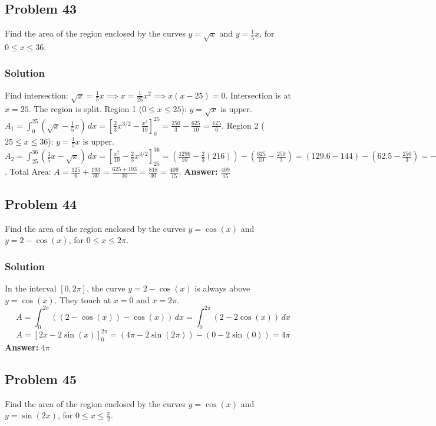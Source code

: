 \documentclass{article}
\begin{document}
\subsection{Problem 43}
Find the area of the region enclosed by the curves $y = \sqrt{x}$ and $y = \frac{1}{5}x$, for $0 \le x \le 36$.
\subsubsection*{Solution}
Find intersection: $\sqrt{x} = \frac{1}{5}x \implies x = \frac{1}{25}x^2 \implies x(x-25) = 0$. Intersection is at $x=25$. The region is split.
Region 1 ($0 \le x \le 25$): $y=\sqrt{x}$ is upper. $A_1 = \int_{0}^{25} (\sqrt{x} - \frac{1}{5}x) \,dx = [\frac{2}{3}x^{3/2} - \frac{x^2}{10}]_0^{25} = \frac{250}{3} - \frac{625}{10} = \frac{125}{6}$.
Region 2 ($25 \le x \le 36$): $y=\frac{1}{5}x$ is upper. $A_2 = \int_{25}^{36} (\frac{1}{5}x - \sqrt{x}) \,dx = [\frac{x^2}{10} - \frac{2}{3}x^{3/2}]_{25}^{36} = (\frac{1296}{10} - \frac{2}{3}(216)) - (\frac{625}{10} - \frac{250}{3}) = (129.6 - 144) - (62.5 - \frac{250}{3}) = -14.4 - (-\frac{125}{6}) = \frac{193}{30}$.
Total Area: $A = \frac{125}{6} + \frac{193}{30} = \frac{625+193}{30} = \frac{818}{30} = \frac{409}{15}$.
\textbf{Answer:} $ \frac{409}{15} $

\subsection{Problem 44}
Find the area of the region enclosed by the curves $y = \cos(x)$ and $y = 2 - \cos(x)$, for $0 \le x \le 2\pi$.
\subsubsection*{Solution}
In the interval $[0, 2\pi]$, the curve $y = 2 - \cos(x)$ is always above $y = \cos(x)$. They touch at $x=0$ and $x=2\pi$.
$$ A = \int_{0}^{2\pi} ((2 - \cos(x)) - \cos(x)) \,dx = \int_{0}^{2\pi} (2 - 2\cos(x)) \,dx $$
$$ A = \left[ 2x - 2\sin(x) \right]_{0}^{2\pi} = (4\pi - 2\sin(2\pi)) - (0 - 2\sin(0)) = 4\pi $$
\textbf{Answer:} $ 4\pi $

\subsection{Problem 45}
Find the area of the region enclosed by the curves $y = \cos(x)$ and $y = \sin(2x)$, for $0 \le x \le \frac{\pi}{2}$.
\end{document}
